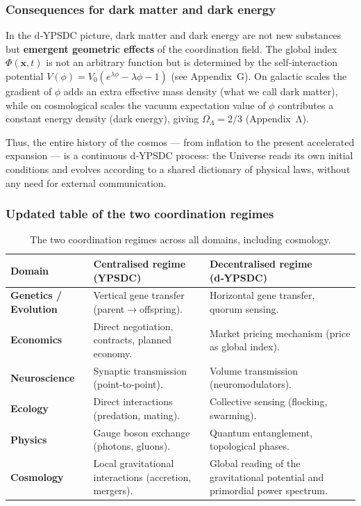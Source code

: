 \documentclass[11pt,a4paper]{article}
\begin{document}
\subsubsection*{Consequences for dark matter and dark energy}
In the d‑YPSDC picture, dark matter and dark energy are not new
substances but \textbf{emergent geometric effects} of the coordination
field.  The global index \(\Phi(\mathbf{x},t)\) is not an arbitrary
function but is determined by the self‑interaction potential
\(V(\phi) = V_0 (e^{\lambda \phi} - \lambda \phi - 1)\) (see
Appendix~G).  On galactic scales the gradient of \(\phi\) adds an extra
effective mass density (what we call dark matter), while on cosmological
scales the vacuum expectation value of \(\phi\) contributes a constant
energy density (dark energy), giving \(\Omega_\Lambda = 2/3\)
(Appendix~Λ).

Thus, the entire history of the cosmos — from inflation to the present
accelerated expansion — is a continuous d‑YPSDC process: the Universe
reads its own initial conditions and evolves according to a shared
dictionary of physical laws, without any need for external
communication.

\subsubsection*{Updated table of the two coordination regimes}
\begin{table}[htbp]
	\centering
	\caption{The two coordination regimes across all domains, including cosmology.}
	\label{tab:two-regimes-full}
	\small
	\begin{tabular}{p{2.5cm}p{4.5cm}p{4.5cm}}
		\toprule
		\textbf{Domain} & \textbf{Centralised regime (YPSDC)} & \textbf{Decentralised regime (d‑YPSDC)} \\
		\midrule
		\textbf{Genetics / Evolution} &
		Vertical gene transfer (parent$\to$offspring). &
		Horizontal gene transfer, quorum sensing. \\
		\midrule
		\textbf{Economics} &
		Direct negotiation, contracts, planned economy. &
		Market pricing mechanism (price as global index). \\
		\midrule
		\textbf{Neuroscience} &
		Synaptic transmission (point‑to‑point). &
		Volume transmission (neuromodulators). \\
		\midrule
		\textbf{Ecology} &
		Direct interactions (predation, mating). &
		Collective sensing (flocking, swarming). \\
		\midrule
		\textbf{Physics} &
		Gauge boson exchange (photons, gluons). &
		Quantum entanglement, topological phases. \\
		\midrule
		\textbf{Cosmology} &
		Local gravitational interactions (accretion, mergers). &
		Global reading of the gravitational potential and primordial power spectrum. \\
		\bottomrule
	\end{tabular}
\end{table}
\end{document}

